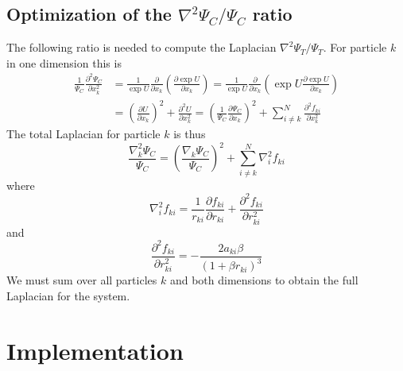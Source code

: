 \documentclass[english, a4paper]{article}
\begin{document}
\subsection{Optimization of the $\nabla^2 \Psi_C / \Psi_C$ ratio}
The following ratio is needed to compute the Laplacian $\nabla^2 \Psi_T / \Psi_T$. 
For particle $k$ in one dimension this is
\begin{align}
 \frac{1}{\Psi_C}\frac{\partial^2 \Psi_C}{\partial x_k^2} &= 
 \frac{1}{\exp{U}}\frac{\partial}{\partial x_k}\left(\frac{\partial \exp{U}}{\partial x_k}\right) = 
 \frac{1}{\exp{U}}\frac{\partial}{\partial x_k}\left(\exp{U}\frac{\partial \exp{U}}{\partial x_k}\right)\\ &= 
 \left(\frac{\partial U}{\partial x_k}\right)^2 + \frac{\partial^2 U}{\partial x_k^2} =
 \left(\frac{1}{\Psi_C}\frac{\partial \Psi_C}{\partial x_k}\right)^2 + 
 \sum_{i\neq k}^N \frac{\partial^2 f_{ki}}{\partial x_k^2}
\end{align}
The total Laplacian for particle $k$ is thus
\begin{equation}
 \frac{\nabla^2_k \Psi_C}{\Psi_C} = \left(\frac{\nabla_k \Psi_C}{\Psi_C}\right)^2 + 
 \sum_{i\neq k}^N \nabla_i^2 f_{ki}
\end{equation}
where
\begin{equation}
 \nabla_i^2 f_{ki}  = 
 \frac{1}{r_{ki}}\frac{\partial f_{ki}}{\partial r_{ki}} + \frac{\partial^2 f_{ki}}{\partial r_{ki}^2}
\end{equation}
and 
\begin{equation}
 \frac{\partial^2 f_{ki}}{\partial r_{ki}^2} = -\frac{2a_{ki}\beta}{(1 + \beta r_{ki})^3}
\end{equation}
We must sum over all particles $k$ and both dimensions to obtain the full Laplacian for the system.



\section{Implementation}
\end{document}
